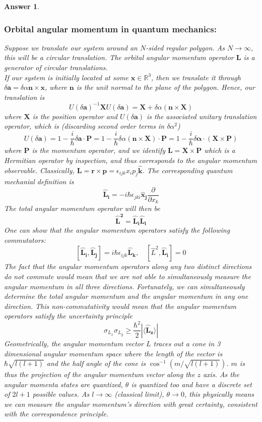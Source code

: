 \documentclass[a4paper]{article}
\newtheorem{ans}{Answer}[subsection]
\theoremstyle{new}
\begin{document}
\begin{ans}
\subsubsection*{Orbital angular momentum in quantum mechanics:}
Suppose we translate our system around an $N$-sided regular polygon. As $N\rightarrow\infty$, this will be a circular translation. The orbital angular momentum operator $\mathbf{L}$ is a generator of circular translations.\\[5pt]
If our system is initially located at some $\mathbf{x}\in\mathbb{R}^3$, then we translate it through $\delta\mathbf{a}=\delta\alpha\mathbf{n}\times\mathbf{x}$, where $\mathbf{n}$ is the unit normal to the plane of the polygon. Hence, our translation is
$$U(\delta\mathbf{a})^{-1}\mathbf{X}U(\delta\mathbf{a})=\mathbf{X}+\delta\alpha(\mathbf{n}\times\mathbf{X})$$
where $\mathbf{X}$ is the position operator and $U(\delta\mathbf{a})$ is the associated unitary translation operator, which is (discarding second order terms in $\delta\alpha^2$)
$$U(\delta\mathbf{a})=1-\frac{i}{\hbar}\delta\mathbf{a}\cdot\mathbf{P}=1-\frac{i}{\hbar}\delta\alpha(\mathbf{n}\times\mathbf{X})\cdot\mathbf{P}=1-\frac{i}{\hbar}\delta\boldsymbol{\alpha}\cdot(\mathbf{X}\times\mathbf{P})$$
where $\mathbf{P}$ is the momentum operator, and we identify $\mathbf{L}=\mathbf{X}\times\mathbf{P}$ which is a Hermitian operator by inspection, and thus corresponds to the angular momentum observable. Classically,  $\mathbf{L}=\mathbf{r}\times\mathbf{p}=\epsilon_{ijk}x_ip_j\mathbf{\hat{k}}$. The corresponding quantum mechanial definition is
$$\mathbf{\hat{L}_i}=-i\hbar\epsilon_{jki}\mathbf{\hat{x}_j}\frac{\partial}{\partial x_k}$$ 
The total angular momentum operator will then be 
$$\mathbf{\hat{L}^2}=\mathbf{\hat{L}_i}\mathbf{\hat{L}_i}$$
One can show that the angular momentum operators satisfy the following commutators:
$$[\mathbf{\hat{L}_i},\mathbf{\hat{L}_j}]=i\hbar\epsilon_{ijk}\mathbf{\hat{L}_k},\quad [\hat{L}^2,\mathbf{\hat{L}_i}]=0$$
The fact that the angular momentum operators along any two distinct directions do not commute would mean that we are not able to simultaneously measure the angular momentum in all three directions. Fortunately, we can simultaneously determine the total angular momentum and the angular momentum in any one direction. This non-commutativity would mean that the angular momentum operators satisfy the uncertainty principle
$$\sigma_{L_x}\sigma_{L_y}\geq\frac{\hbar^2}{2}|\langle\mathbf{\hat{L}_z}\rangle|$$
Geometrically, the angular momentum vector $L$ traces out a cone in 3 dimensional angular momentum space where the length of the vector is $\hbar\sqrt{l(l+1)}$ and the half angle of the cone is $\cos^{-1}(m/\sqrt{l(l+1)})$.  $m$ is thus the projection of the angular momentum vector along the $z$ axis. As the angular momenta states are quantized, $\theta$ is quantized too and have a discrete set of $2l + 1$ possible values. As $l\rightarrow\infty$ (classical limit), $\theta\rightarrow 0$, this physically means we can measure the angular momentum's direction with great certainty, consistent with the correspondence principle.\\[5pt]

\end{ans}
\end{document}
